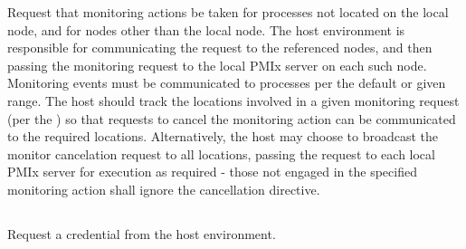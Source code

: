 Request that monitoring actions be taken for processes not located on the local node, and for nodes other than the local node. The host environment is responsible for communicating the request to the referenced nodes, and then passing the monitoring request to the local \ac{PMIx} server on each such node. Monitoring events must be communicated to processes per the default or given range. The host should track the locations involved in a given monitoring request (per the ) so that requests to cancel the monitoring action can be communicated to the required locations. Alternatively, the host may choose to broadcast the monitor cancelation request to all locations, passing the request to each local \ac{PMIx} server for execution as required - those not engaged in the specified monitoring action shall ignore the cancellation directive.

\subsection{}

\summary

Request a credential from the host environment.

\format


\begin{arglist}
\end{arglist}

